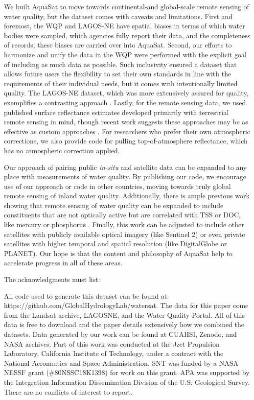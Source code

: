 \documentclass[draft,linenumbers]{agujournal2018}
\begin{document}
We built AquaSat to move towards continental-and global-scale remote
sensing of water quality, but the dataset comes with caveats and
limitations. First and foremost, the WQP and LAGOS-NE have spatial
biases in terms of which water bodies were sampled, which agencies fully
report their data, and the completeness of records; these biases are
carried over into AquaSat. Second, our efforts to harmonize and unify
the data in the WQP were performed with the explicit goal of including
as much data as possible. Such inclusivity ensured a dataset that allows
future users the flexibility to set their own standards in line with the
requirements of their individual needs, but it comes with intentionally
limited quality. The LAGOS-NE dataset, which was more extensively
assured for quality, exemplifies a contrasting approach
\citep{Soranno2017,Soranno2015}. Lastly, for the remote sensing data, we
used published surface reflectance estimates developed primarily with
terrestrial remote sensing in mind, though recent work suggests these
approaches may be as effective as custom approaches \citep{Kuhn2019}.
For researchers who prefer their own atmospheric corrections, we also
provide code for pulling top-of-atmosphere reflectance, which has no
atmospheric correction applied.

Our approach of pairing public \emph{in-situ} and satellite data can be
expanded to any place with measurements of water quality. By publishing
our code, we encourage use of our approach or code in other countries,
moving towards truly global remote sensing of inland water quality.
Additionally, there is ample previous work showing that remote sensing
of water quality can be expanded to include constituents that are not
optically active but are correlated with TSS or DOC, like mercury
\citep{Fichot2016,Telmer2006} or phosphorus \citep{Kutser1995}. Finally,
this work can be adjusted to include other satellites with publicly
available optical imagery (like Sentinel 2) or even private satellites
with higher temporal and spatial resolution (like DigitalGlobe or
PLANET). Our hope is that the content and philosophy of AquaSat help to
accelerate progress in all of these areas.

\acknowledgments

The acknowledgments must list:

All code used to generate this dataset can be found at:
https://github.com/GlobalHydrologyLab/watersat. The data for this paper
come from the Landsat archive, LAGOSNE, and the Water Quality Portal.
All of this data is free to download and the paper details extensively
how we combined the datasets. Data generated by our work can be found at
CUAHSI, Zenodo, and NASA archives. Part of this work was conducted at
the Jzet Propulsion Laboratory, California Institute of Technology,
under a contract with the National Aeronautics and Space Administration.
SNT was funded by a NASA NESSF grant (\#80NSSC18K1398) for work on this
grant. APA was supported by the Integration Information Dissemination
Division of the U.S. Geological Survey. There are no conflicts of
interest to report.


\end{document}

